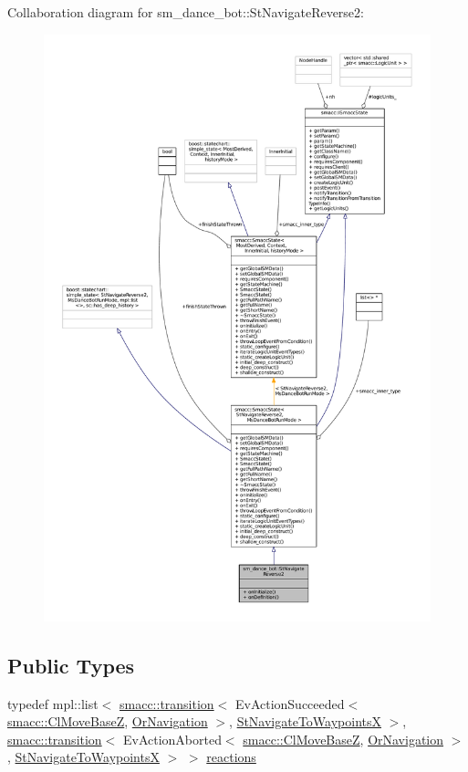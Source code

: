 Collaboration diagram for sm\+\_\+dance\+\_\+bot\+:\+:St\+Navigate\+Reverse2\+:
\nopagebreak
\begin{figure}[H]
\begin{center}
\leavevmode
\includegraphics[width=350pt]{structsm__dance__bot_1_1StNavigateReverse2__coll__graph}
\end{center}
\end{figure}
\subsection*{Public Types}
\begin{DoxyCompactItemize}
\item 
typedef mpl\+::list$<$ \hyperlink{classsmacc_1_1transition}{smacc\+::transition}$<$ Ev\+Action\+Succeeded$<$ \hyperlink{classsmacc_1_1ClMoveBaseZ}{smacc\+::\+Cl\+Move\+BaseZ}, \hyperlink{classsm__dance__bot_1_1OrNavigation}{Or\+Navigation} $>$, \hyperlink{structsm__dance__bot_1_1StNavigateToWaypointsX}{St\+Navigate\+To\+WaypointsX} $>$, \hyperlink{classsmacc_1_1transition}{smacc\+::transition}$<$ Ev\+Action\+Aborted$<$ \hyperlink{classsmacc_1_1ClMoveBaseZ}{smacc\+::\+Cl\+Move\+BaseZ}, \hyperlink{classsm__dance__bot_1_1OrNavigation}{Or\+Navigation} $>$, \hyperlink{structsm__dance__bot_1_1StNavigateToWaypointsX}{St\+Navigate\+To\+WaypointsX} $>$ $>$ \hyperlink{structsm__dance__bot_1_1StNavigateReverse2_a072c8736a8ca0c6a9771a6e6cf817ba0}{reactions}
\end{DoxyCompactItemize}
